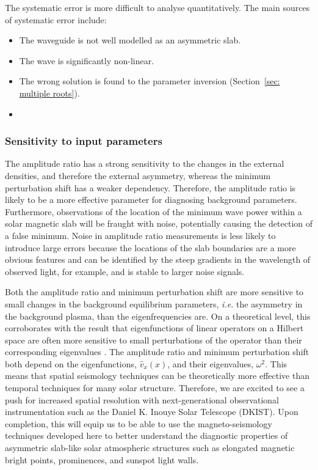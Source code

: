 \documentclass[12pt]{../style-files/ociamthesis}
\begin{document}
The systematic error is more difficult to analyse quantitatively. The main sources of systematic error include:
\begin{itemize}
	\item The waveguide is not well modelled as an asymmetric slab.
	\item The wave is significantly non-linear.
	\item The wrong solution is found to the parameter inversion (Section~\ref{sec: multiple roots}).
	\item 
\end{itemize}


\subsubsection{Sensitivity to input parameters}

The amplitude ratio has a strong sensitivity to the changes in the external densities, and therefore the external asymmetry, whereas the minimum perturbation shift has a weaker dependency. Therefore, the amplitude ratio is likely to be a more effective parameter for diagnosing background parameters. Furthermore, observations of the location of the minimum wave power within a solar magnetic slab will be fraught with noise, potentially causing the detection of a false minimum. Noise in amplitude ratio measurements is less likely to introduce large errors because the locations of the slab boundaries are a more obvious features and can be identified by the steep gradients in the wavelength of observed light, for example, and is stable to larger noise signals.

Both the amplitude ratio and minimum perturbation shift are more sensitive to small changes in the background equilibrium parameters, \emph{i.e.} the asymmetry in the background plasma, than the eigenfrequencies are. On a theoretical level, this corroborates with the result that eigenfunctions of linear operators on a Hilbert space are often more sensitive to small perturbations of the operator than their corresponding eigenvalues \citep{kat95}. The amplitude ratio and minimum perturbation shift both depend on the eigenfunctions, $\widehat{v}_x(x)$, and their eigenvalues, $\omega^2$. This means that spatial seismology techniques can be theoretically more effective than temporal techniques for many solar structure. Therefore, we are excited to see a push for increased spatial resolution with next-generational observational instrumentation such as the Daniel K. Inouye Solar Telescope (DKIST). Upon completion, this will equip us to be able to use the magneto-seismology techniques developed here to better understand the diagnostic properties of asymmetric slab-like solar atmospheric structures such as elongated magnetic bright points, prominences, and sunspot light walls.
\end{document}
